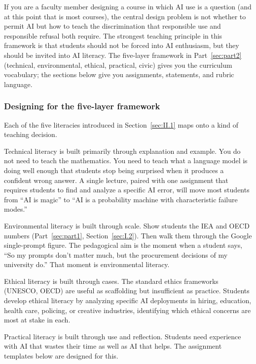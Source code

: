 \documentclass[12pt]{article}
\begin{document}
If you are a faculty member designing a course in which AI use is a question (and at this point that is most courses), the central design problem is not whether to permit AI but how to teach the discrimination that responsible use and responsible refusal both require. The strongest teaching principle in this framework is that students should not be forced into AI enthusiasm, but they should be invited into AI literacy. The five-layer framework in Part~\ref{sec:part2} (technical, environmental, ethical, practical, civic) gives you the curriculum vocabulary; the sections below give you assignments, statements, and rubric language.

\subsubsection*{Designing for the five-layer framework}

Each of the five literacies introduced in Section~\ref{sec:II.1} maps onto a kind of teaching decision.

Technical literacy is built primarily through explanation and example. You do not need to teach the mathematics. You need to teach what a language model is doing well enough that students stop being surprised when it produces a confident wrong answer. A single lecture, paired with one assignment that requires students to find and analyze a specific AI error, will move most students from ``AI is magic'' to ``AI is a probability machine with characteristic failure modes.''

Environmental literacy is built through scale. Show students the IEA and OECD numbers (Part~\ref{sec:part1}, Section~\ref{sec:I.2}). Then walk them through the Google single-prompt figure. The pedagogical aim is the moment when a student says, ``So my prompts don't matter much, but the procurement decisions of my university do.'' That moment is environmental literacy.

Ethical literacy is built through cases. The standard ethics frameworks (UNESCO, OECD) are useful as scaffolding but insufficient as practice. Students develop ethical literacy by analyzing specific AI deployments in hiring, education, health care, policing, or creative industries, identifying which ethical concerns are most at stake in each.

Practical literacy is built through use and reflection. Students need experience with AI that wastes their time as well as AI that helps. The assignment templates below are designed for this.
\end{document}
